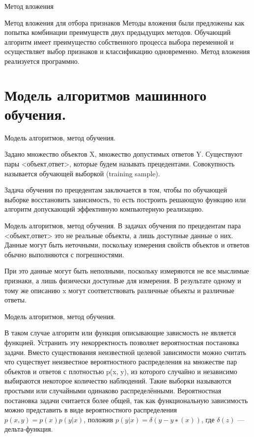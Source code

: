 \documentclass{beamer}
\begin{document}
\begin{frame}{Метод вложения}

Метод вложения для отбора признаков
Методы вложения были предложены как попытка комбинации преимуществ двух предыдущих методов. 
Обучающий алгоритм имеет преимущество 
собственного процесса выбора переменной и осуществляет выбор признаков и классификацию одновременно. 
Метод вложения реализуется программно. 
\end{frame}




\section{Модель алгоритмов машинного обучения.}

\begin{frame}{Модель алгоритмов, метод обучения.}

Задано множество объектов X, множество допустимых ответов Y. 
Существуют пары <объект,ответ>,  которые будем  называть прецедентами. 
Совокупность  называется обучающей выборкой (training sample).



Задача обучения по прецедентам заключается в том, чтобы по  обучающей выборке 
восстановить зависимость, то есть построить решающую функцию  или алгоритм допускающий эффективную компьютерную 
реализацию.

\end{frame}  

\begin{frame}{Модель алгоритмов, метод обучения.}
В задачах обучения по прецедентам  пара <объект,ответ> 
это не реальные объекты, а лишь доступные данные о них. 
Данные могут быть неточными, поскольку измерения  свойств объектов и ответов обычно
выполняются с погрешностями. 

При это данные могут быть неполными, 
поскольку измеряются не все мыслимые признаки, а лишь физически доступные для измерения.
В результате одному и тому же описанию x могут соответствовать различные объекты и различные ответы. 
\end{frame}  

\begin{frame}{Модель алгоритмов, метод обучения.}

В таком случае   алгоритм или функция описывающие зависмость  не является функцией.
Устранить эту некорректность позволяет вероятностная постановка задачи.
Вместо существования неизвестной целевой зависимости можно считать что 
существует  неизвестное вероятностного распределения на множестве пар объектов и ответов
с плотностью p(x, y), из которого случайно и независимо выбираются  некоторое количество  наблюдений. 
Такие выборки называются простыми или случайными одинаково распределёнными.
Вероятностная постановка задачи считается более общей, так как функциональную зависимость можно 
представить в виде вероятностного распределения $p(x, y) = p(x)p(y|x)$, положив $p(y|x) = δ(y − y ∗ (x))$, где $\delta(z)$ — дельта-функция.

\end{frame}  
\end{document}
